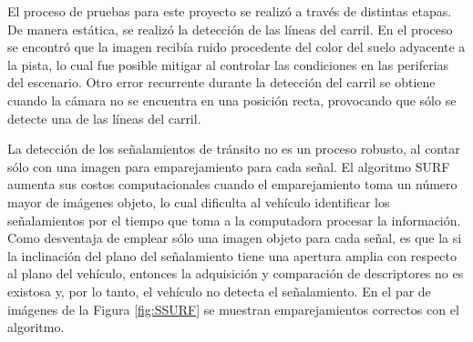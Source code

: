 El proceso de pruebas para este proyecto se realizó a través de distintas etapas. De manera estática, se realizó la detección de las líneas del carril. En el proceso se encontró que la imagen recibía ruido procedente del color del suelo adyacente a la pista, lo cual fue posible mitigar al controlar las condiciones en las periferias del escenario. Otro error recurrente durante la detección del carril se obtiene cuando la cámara no se encuentra en una posición recta, provocando que sólo se detecte una de las líneas del carril.
\par La detección de los señalamientos de tránsito no es un proceso robusto, al contar sólo con una imagen para emparejamiento para cada señal. El algoritmo SURF aumenta sus costos computacionales cuando el emparejamiento toma un número mayor de imágenes objeto, lo cual dificulta al vehículo identificar los señalamientos por el tiempo que toma a la computadora procesar la información. Como desventaja de emplear sólo una imagen objeto para cada señal, es que la si la inclinación del plano del señalamiento tiene una apertura amplia con respecto al plano del vehículo, entonces la adquisición y comparación de descriptores no es existosa y, por lo tanto, el vehículo no detecta el señalamiento. En el par de imágenes de la Figura \ref{fig:SSURF} se muestran emparejamientos correctos con el algoritmo.
